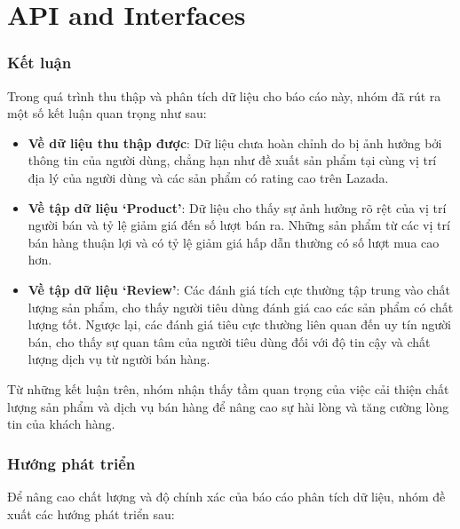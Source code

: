 \part{API and Interfaces}

\section{Kết luận}
Trong quá trình thu thập và phân tích dữ liệu cho báo cáo này, nhóm đã rút ra một số kết luận quan trọng như sau:

\begin{itemize}
    \item \textbf{Về dữ liệu thu thập được}: Dữ liệu chưa hoàn chỉnh do bị ảnh hưởng bởi thông tin của người dùng, chẳng hạn như đề xuất sản phẩm tại cùng vị trí địa lý của người dùng và các sản phẩm có rating cao trên Lazada.
    \item \textbf{Về tập dữ liệu ‘Product’}: Dữ liệu cho thấy sự ảnh hưởng rõ rệt của vị trí người bán và tỷ lệ giảm giá đến số lượt bán ra. Những sản phẩm từ các vị trí bán hàng thuận lợi và có tỷ lệ giảm giá hấp dẫn thường có số lượt mua cao hơn.
    \item \textbf{Về tập dữ liệu ‘Review’}: Các đánh giá tích cực thường tập trung vào chất lượng sản phẩm, cho thấy người tiêu dùng đánh giá cao các sản phẩm có chất lượng tốt. Ngược lại, các đánh giá tiêu cực thường liên quan đến uy tín người bán, cho thấy sự quan tâm của người tiêu dùng đối với độ tin cậy và chất lượng dịch vụ từ người bán hàng. 
\end{itemize}

Từ những kết luận trên, nhóm nhận thấy tầm quan trọng của việc cải thiện chất lượng sản phẩm và dịch vụ bán hàng để nâng cao sự hài lòng và tăng cường lòng tin của khách hàng.



\section{Hướng phát triển}
Để nâng cao chất lượng và độ chính xác của báo cáo phân tích dữ liệu, nhóm đề xuất các hướng phát triển sau:

